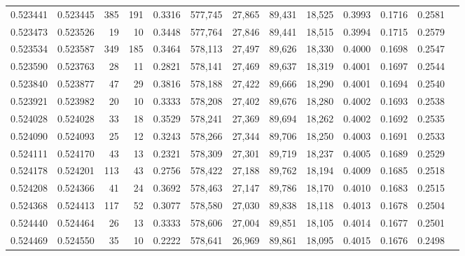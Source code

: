\begin{tabular}{rrrrrrrrrrrrr}
0.523441 & 0.523445 &   385 &   191 &                                     0.3316 & 577,745 &  27,865 &  89,431 &  18,525 & 0.3993 & 0.1716 & 0.2581 \\
0.523473 & 0.523526 &    19 &    10 &                                     0.3448 & 577,764 &  27,846 &  89,441 &  18,515 & 0.3994 & 0.1715 & 0.2579 \\
0.523534 & 0.523587 &   349 &   185 &                                     0.3464 & 578,113 &  27,497 &  89,626 &  18,330 & 0.4000 & 0.1698 & 0.2547 \\
0.523590 & 0.523763 &    28 &    11 &                                     0.2821 & 578,141 &  27,469 &  89,637 &  18,319 & 0.4001 & 0.1697 & 0.2544 \\
0.523840 & 0.523877 &    47 &    29 &                                     0.3816 & 578,188 &  27,422 &  89,666 &  18,290 & 0.4001 & 0.1694 & 0.2540 \\
0.523921 & 0.523982 &    20 &    10 &                                     0.3333 & 578,208 &  27,402 &  89,676 &  18,280 & 0.4002 & 0.1693 & 0.2538 \\
0.524028 & 0.524028 &    33 &    18 &                                     0.3529 & 578,241 &  27,369 &  89,694 &  18,262 & 0.4002 & 0.1692 & 0.2535 \\
0.524090 & 0.524093 &    25 &    12 &                                     0.3243 & 578,266 &  27,344 &  89,706 &  18,250 & 0.4003 & 0.1691 & 0.2533 \\
0.524111 & 0.524170 &    43 &    13 &                                     0.2321 & 578,309 &  27,301 &  89,719 &  18,237 & 0.4005 & 0.1689 & 0.2529 \\
0.524178 & 0.524201 &   113 &    43 &                                     0.2756 & 578,422 &  27,188 &  89,762 &  18,194 & 0.4009 & 0.1685 & 0.2518 \\
0.524208 & 0.524366 &    41 &    24 &                                     0.3692 & 578,463 &  27,147 &  89,786 &  18,170 & 0.4010 & 0.1683 & 0.2515 \\
0.524368 & 0.524413 &   117 &    52 &                                     0.3077 & 578,580 &  27,030 &  89,838 &  18,118 & 0.4013 & 0.1678 & 0.2504 \\
0.524440 & 0.524464 &    26 &    13 &                                     0.3333 & 578,606 &  27,004 &  89,851 &  18,105 & 0.4014 & 0.1677 & 0.2501 \\
0.524469 & 0.524550 &    35 &    10 &                                     0.2222 & 578,641 &  26,969 &  89,861 &  18,095 & 0.4015 & 0.1676 & 0.2498 \\

\end{tabular}
